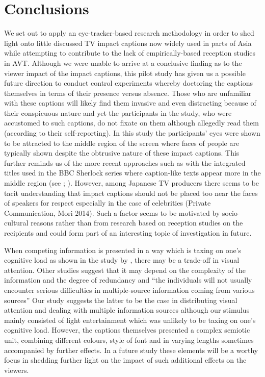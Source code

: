 \documentclass[output=paper]{langsci/langscibook}
\begin{document}
\section{Conclusions}

We set out to apply an eye-tracker-based research methodology in order to shed light onto little discussed TV impact captions now widely used in parts of Asia while attempting to contribute to the lack of empirically-based reception studies in AVT. Although we were unable to arrive at a conclusive finding as to the viewer impact of the impact captions, this pilot study has given us a possible future direction to conduct control experiments whereby doctoring the captions themselves in terms of their presence versus absence. Those who are unfamiliar with these captions will likely find them invasive and even distracting because of their conspicuous nature and yet the participants in the study, who were accustomed to such captions, do not fixate on them although allegedly read them (according to their self-reporting). In this study the participants' eyes were shown to be attracted to the middle region of the screen where faces of people are typically shown despite the obtrusive nature of these impact captions. This further reminds us of the more recent approaches such as with the integrated titles used in the BBC Sherlock series where caption-like texts appear more in the middle region (see \citealt{Sasamoto2014}; \citealt{Dwyer2015}).  However, among Japanese TV producers there seems to be tacit understanding that impact captions should not be placed too near the faces of speakers for respect especially in the case of celebrities (Private Communication, Mori 2014).  Such a factor seems to be motivated by socio-cultural reasons rather than from research based on reception studies on the recipients and could form part of an interesting topic of investigation in future. 


When competing information is presented in a way which is taxing on one's cognitive load as shown in the study by \citet{caffrey2009}, there may be a trade-off in visual attention.  Other studies \citep[265]{perego2010} suggest that it may depend on the complexity of the information and the degree of redundancy and ``the individuals will not usually encounter serious difficulties in multiple-source information coming from various sources'' Our study suggests the latter to be the case in distributing visual attention and dealing with multiple information sources although our stimulus mainly consisted of light entertainment which was unlikely to be taxing on one's cognitive load.  However, the captions themselves presented a complex semiotic unit, combining different colours, style of font and in varying lengths sometimes accompanied by further effects. In a future study these elements will be a worthy focus in shedding further light on the impact of such additional effects on the viewers. 
\end{document}
